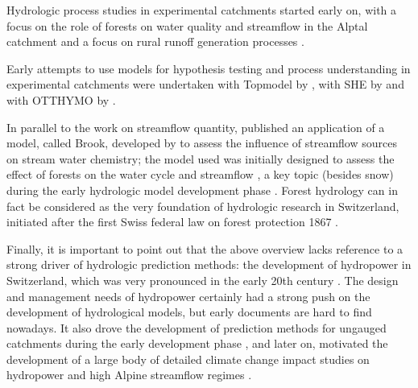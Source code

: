 \documentclass{article}
\begin{document}
Hydrologic process studies in experimental catchments started early on, with a focus on the role of forests on water quality and streamflow in the Alptal catchment \citep{keller1970, keller1989} and a focus on rural runoff generation processes \citep{jaton1982}.

Early attempts to use models for hypothesis testing and process understanding in experimental catchments \citep{jordan1990} were  undertaken with Topmodel by \citet{Iorgulescu1994}, with SHE by \citet{jordan1987} and with OTTHYMO by \citet{wisner1983}.

In parallel to the work on streamflow quantity, \citet{keller1991} published an application of a model, called Brook, developed by \citet{federer1978} to assess the influence of streamflow sources on stream water chemistry; the model used was initially designed to assess the effect of forests on the water cycle and streamflow \citep{foster1989}, a key topic (besides snow) during the early hydrologic model development phase \citep{keller1979, hegg2006}. Forest hydrology can in fact be considered as the very foundation of hydrologic research in Switzerland, initiated after the first Swiss federal law on forest protection 1867 \citep{keller1985, hegg2006}.

Finally, it is important to point out that the above overview lacks reference to a strong  driver of hydrologic prediction methods: the development of hydropower in Switzerland, which was very pronounced in the early 20th century \citep{jeger1942}. The design and management needs of hydropower certainly had a strong push on the development of hydrological models, but early documents are hard to find nowadays. It also drove the development of prediction methods for ungauged catchments during the early development phase \citep{bruschin1977}, and later on, motivated the development of a large body of detailed climate change impact studies on hydropower and high Alpine streamflow regimes \citep{westaway2000,schaefli2015}. 



\clearpage
\end{document}
